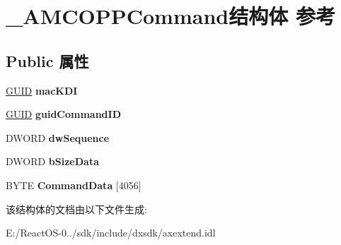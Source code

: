 \hypertarget{struct___a_m_c_o_p_p_command}{}\section{\+\_\+\+A\+M\+C\+O\+P\+P\+Command结构体 参考}
\label{struct___a_m_c_o_p_p_command}
\subsection*{Public 属性}
\begin{DoxyCompactItemize}
\item 
\mbox{\label{struct___a_m_c_o_p_p_command_a525472d06b11ca0c97e1be3490b96f8a}} 
\hyperlink{interface_g_u_i_d}{G\+U\+ID} {\bfseries mac\+K\+DI}
\item 
\mbox{\label{struct___a_m_c_o_p_p_command_ab408bec5b79a631acd820b54c5cb5f4d}} 
\hyperlink{interface_g_u_i_d}{G\+U\+ID} {\bfseries guid\+Command\+ID}
\item 
\mbox{\label{struct___a_m_c_o_p_p_command_ab256679386247c68de46ab42907e4678}} 
D\+W\+O\+RD {\bfseries dw\+Sequence}
\item 
\mbox{\label{struct___a_m_c_o_p_p_command_a072b54524731f4e72688d85ec0c5c003}} 
D\+W\+O\+RD {\bfseries b\+Size\+Data}
\item 
\mbox{\label{struct___a_m_c_o_p_p_command_aac758be926dfb6ded169efd50bf2e0ae}} 
B\+Y\+TE {\bfseries Command\+Data} \mbox{[}4056\mbox{]}
\end{DoxyCompactItemize}


该结构体的文档由以下文件生成\+:\begin{DoxyCompactItemize}
\item 
E\+:/\+React\+O\+S-\/0../sdk/include/dxsdk/axextend.\+idl\end{DoxyCompactItemize}
